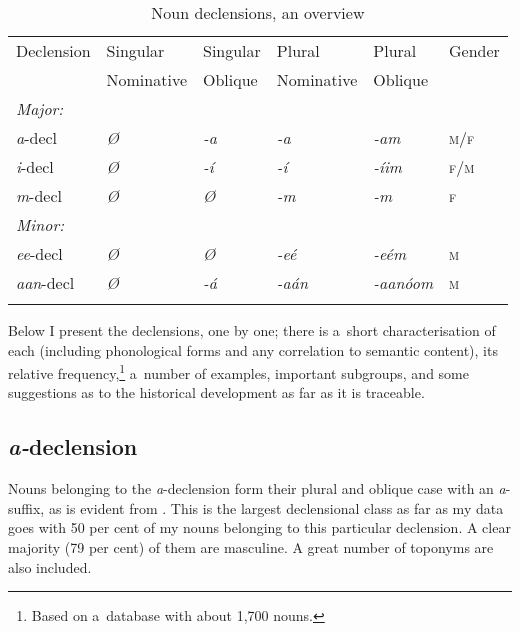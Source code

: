 \begin{table}[ht]
\caption{Noun declensions, an overview}
\begin{tabularx}{\textwidth}{ Q Q Q Q Q Q}
\lsptoprule
Declension &
Singular &
Singular &
Plural &
Plural &
Gender \\
&
Nominative &
Oblique &
Nominative &
Oblique
\\\midrule
\textit{Major:}\\
\textit{a}-decl &
\textit{Ø} &
\textit{-a} &
\textit{-a} &
\textit{-am} &
\textsc{m/f} \\
\textit{i}-decl &
\textit{Ø} &
\textit{-í} &
\textit{-í} &
\textit{-íim} &
\textsc{f/m} \\
\textit{m}-decl &
\textit{Ø} &
\textit{Ø} &
\textit{-m} &
\textit{-m} &
\textsc{f} \\
\textit{Minor:}\\
\textit{ee}-decl &
\textit{Ø} &
\textit{Ø} &
\textit{-eé} &
\textit{-eém} &
\textsc{m}\\
\textit{aan}-decl &
\textit{Ø} &
\textit{-á} &
\textit{-aán} &
\textit{-aanóom} &
\textsc{m} \\\lspbottomrule
\end{tabularx}
\label{tab:4-5b}
\end{table}

  
  Below I present the declensions, one by one;
  there is a~short characterisation of each (including phonological forms and any correlation to
  semantic content), its relative frequency,\footnote{Based on a~database with about 1,700 nouns.} a~number of examples, important subgroups, and some suggestions as to the historical development as far as it is traceable.


\subsection{\textit{a-}declension}
\label{subsec:4-6-1}


Nouns belonging to the \textit{a}-declension form their plural and oblique case with an \textit{a}-suffix, as is evident from . This is the largest declensional class as far as my data goes with 50 per cent of my nouns belonging to this particular declension. A clear majority (79 per cent) of them are masculine. A great number of toponyms are also included.



